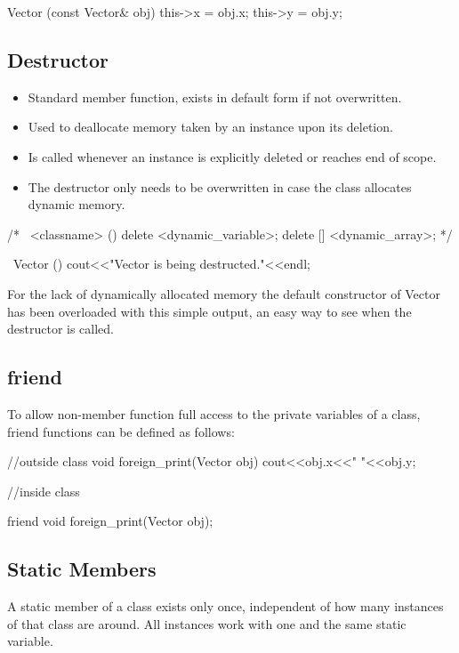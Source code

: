 \documentclass[10pt,a4paper]{scrartcl}
\begin{document}
\begin{multicols*}{2}
\begin{TPCpp}
Vector (const Vector& obj){
	this->x = obj.x;
	this->y = obj.y;
}
\end{TPCpp}

\subsection{Destructor}

\begin{itemize}
\item Standard member function, exists in default form if not overwritten.
\item Used to deallocate memory taken by an instance upon its deletion.
\item Is called whenever an instance is explicitly deleted or reaches end of scope.
\item The destructor only needs to be overwritten in case the class allocates dynamic memory.
\end{itemize}

\begin{TPCpp}
/*
~<classname> (){
	delete <dynamic_variable>;
	delete [] <dynamic_array>;
}
*/

~Vector (){
	cout<<"Vector is being destructed."<<endl;
}
\end{TPCpp}

For the lack of dynamically allocated memory the default constructor of Vector has been overloaded with this simple output, an easy way to see when the destructor is called.

\subsection{friend}

To allow non-member function full access to the private variables of a class, friend functions can be defined as follows:

\begin{TPCpp}
//outside class
void foreign_print(Vector obj){
	cout<<obj.x<<" "<<obj.y;
}

//inside class

friend void foreign_print(Vector obj);
\end{TPCpp}

\subsection{Static Members}

A static member of a class exists only once, independent of how many instances of that class are around. All instances work with one and the same static variable.


\end{multicols*}
\end{document}
